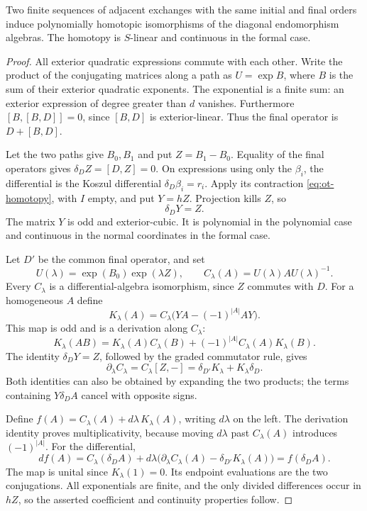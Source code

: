 \begin{theorem}\label{thm:ot-path-homotopy}
Two finite sequences of adjacent exchanges with the same initial
and final orders induce polynomially homotopic isomorphisms of
the diagonal endomorphism algebras.
The homotopy is \(S\)-linear and continuous in the formal case.
\end{theorem}

\begin{proof}
All exterior quadratic expressions commute with each other.
Write the product of the conjugating matrices along a path as
\(U=\exp B\), where \(B\) is the sum of their exterior
quadratic exponents. The exponential is a finite sum:
an exterior expression of degree greater than \(d\) vanishes.
Furthermore \([B,[B,D]]=0\), since \([B,D]\) is
exterior-linear. Thus the final operator is \(D+[B,D]\).

Let the two paths give \(B_0,B_1\) and put \(Z=B_1-B_0\).
Equality of the final operators gives \(\delta_D Z=[D,Z]=0\).
On expressions using only the \(\beta_i\), the differential
is the Koszul differential \(\delta_D\beta_i=r_i\).
Apply its contraction \eqref{eq:ot-homotopy}, with \(I\)
empty, and put \(Y=hZ\). Projection kills \(Z\), so
\[
 \delta_D Y=Z.
\]
The matrix \(Y\) is odd and exterior-cubic.
It is polynomial in the polynomial case and continuous in
the normal coordinates in the formal case.

Let \(D'\) be the common final operator, and set
\[
 U(\lambda)=\exp(B_0)\exp(\lambda Z),\qquad
 C_\lambda(A)=U(\lambda)AU(\lambda)^{-1}.
\]
Every \(C_\lambda\) is a differential-algebra isomorphism,
since \(Z\) commutes with \(D\).
For a homogeneous \(A\) define
\[
 K_\lambda(A)=C_\lambda\bigl(YA-(-1)^{|A|}AY\bigr).
\]
This map is odd and is a derivation along \(C_\lambda\):
\[
 K_\lambda(AB)=K_\lambda(A)C_\lambda(B)
                 +(-1)^{|A|}C_\lambda(A)K_\lambda(B).
\]
The identity \(\delta_DY=Z\), followed by the graded
commutator rule, gives
\[
 \partial_\lambda C_\lambda
  =C_\lambda[Z,-]
  =\delta_{D'}K_\lambda+K_\lambda\delta_D.
\]
Both identities can also be obtained by expanding the two products;
the terms containing \(Y\delta_D A\) cancel with opposite signs.

Define \(f(A)=C_\lambda(A)+d\lambda\,K_\lambda(A)\),
writing \(d\lambda\) on the left. The derivation identity proves
multiplicativity, because moving \(d\lambda\) past
\(C_\lambda(A)\) introduces \((-1)^{|A|}\).
For the differential,
\[
 d f(A)=C_\lambda(\delta_D A)
       +d\lambda\bigl(\partial_\lambda C_\lambda(A)
                            -\delta_{D'}K_\lambda(A)\bigr)
       =f(\delta_D A).
\]
The map is unital since \(K_\lambda(1)=0\).
Its endpoint evaluations are the two conjugations.
All exponentials are finite, and the only divided differences
occur in \(hZ\), so the asserted coefficient and continuity
properties follow.
\end{proof}

